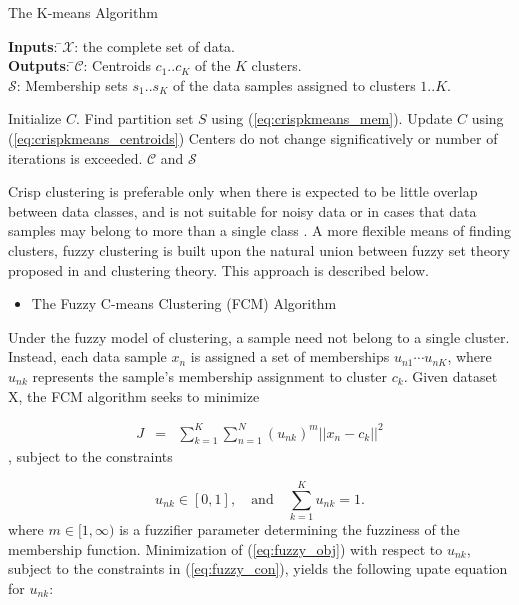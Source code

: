 \documentclass[12pt,dvips]{report}
\numberwithin{equation}{section}
\begin{document}
\begin{algorithm}
  \caption{The K-means Algorithm}
  \label{alg:Kmeans}
  {\begin{tabbing}
  \textbf{Inputs}: \=$\mathcal{X}$: the complete set of data.\\
   \textbf{Outputs}: \=$\mathcal{C}$: Centroids $c_{1}..c_{K}$ of the $K$ clusters.\\
   \>$\mathcal{S}$: Membership sets $s_{1}..s_{K}$ of the data samples assigned to clusters $1..K$.\\
   \end{tabbing}}
  \begin{algorithmic}
    \STATE Initialize $C$.
    \REPEAT 
       \STATE Find partition set $S$ using (\ref{eq:crispkmeans_mem}).
       \STATE Update $C$ using (\ref{eq:crispkmeans_centroids})
    \UNTIL Centers do not change significatively or number of iterations is exceeded.
    \RETURN $\mathcal{C}$ and $\mathcal{S}$
  \end{algorithmic}
\end{algorithm}



Crisp clustering is preferable only when there is expected to be little overlap between data classes, and is not suitable for noisy data or in cases that data samples may belong to more than a single class \cite{bezdek1981}.  A more flexible means of finding clusters, fuzzy clustering \cite{bezdek1981} is built upon the natural union between fuzzy set theory proposed in \cite{zadeh1965fuzzy} and clustering theory. This approach is described below.

\begin{itemize}[leftmargin=12 pt]
\item The Fuzzy C-means Clustering (FCM) Algorithm
\end{itemize}

Under the fuzzy model of clustering, a sample need not belong to a single cluster.  Instead, each data sample $x_{n}$ is assigned a set of memberships $u_{n1}\cdots u_{nK}$, where $u_{nk}$ represents the sample's membership assignment to cluster $c_{k}$.  Given dataset X, the FCM algorithm seeks to minimize

\begin{eqnarray}  \label{eq:fuzzy_obj}
J  & = & \sum_{k=1}^{K}\sum_{n=1}^{N} (u_{nk})^{m} \vert \vert x_{n}-c_{k}\vert \vert ^{2} 
\end{eqnarray}, subject to the constraints

\begin{equation} \label{eq:fuzzy_con}
u_{nk}\in [0,1] , \quad \text{and} \quad  \sum_{k=1}^{K} u_{nk}=1.
\end{equation} where $m \in [1,\infty)$ is a fuzzifier parameter determining the fuzziness of the membership function.  Minimization of (\ref{eq:fuzzy_obj}) with respect to $u_{nk}$, subject to the constraints in (\ref{eq:fuzzy_con}),  yields the following upate equation for $u_{nk}$:
\end{document}
